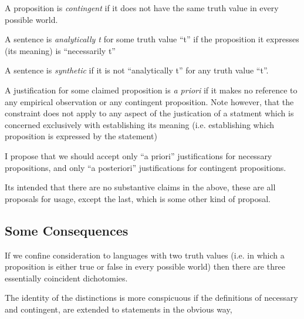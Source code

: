 A proposition is {\it contingent} if it does not have the same truth value in every possible world.

A sentence is {\it analytically t} for some truth value ``t''	if the proposition it expresses (its meaning) is ``necessarily t''

A sentence is {\it synthetic} if it is not ``analytically t'' for any truth value ``t''.

A justification for some claimed proposition is {\it a priori} if it makes no reference to any empirical observation or any contingent proposition.
Note however, that the constraint does not apply to any aspect of the justication of a statment	which is concerned exclusively with establishing its meaning (i.e. establishing which proposition is expressed by the statement)

I propose that we should accept only ``a priori'' justifications for necessary propositions, and only ``a posteriori'' justifications for contingent propositions.

Its intended that there are no substantive claims in the above, these
are all proposals for usage, except the last, which is some other
kind of proposal.

\subsection{Some Consequences}

If we confine consideration to languages with two truth values (i.e.
in which a proposition is either true or false in every possible world)
then there are three essentially coincident dichotomies.

The identity of the distinctions is more conspicuous if the definitions
of necessary and contingent, are extended to statements in the obvious
way,
